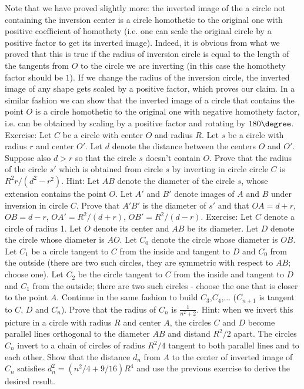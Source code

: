 Note that we have proved slightly more: the inverted image of the a circle not containing the inversion center is a circle homothetic to the original one with positive coefficient of homothety (i.e. one can scale the original circle by a positive factor to get its inverted image). Indeed, it is obvious from what we proved that this is true if the radius of inversion circle is equal to the length of the tangents from $O$ to the circle we are inverting (in this case the homothety factor should be $1$). If we change the radius of the inversion circle, the inverted image of any shape gets scaled by a positive factor, which proves our claim.
In a similar fashion we can show that the inverted image of a circle that contains the point $O$ is a circle homothetic to the original one with negative homothety factor, i.e. can be obtained by scaling by a positive factor and rotating by $180\degree$.
Exercise:
Let $C$ be a circle with center $O$ and radius $R$. Let $s$ be a circle with radius $r$ and center $O'$. Let $d$ denote the distance between the centers $O$ and $O'$. Suppose also $d>r$ so that the circle $s$ doesn't contain $O$. Prove that the radius of the circle $s'$ which is obtained from circle $s$ by inverting in circle circle $C$ is $R^2 r/(d^2-r^2)$.
Hint: Let $AB$ denote the diameter of the circle $s$, whose extension contains the point $O$. Let $A'$ and $B'$ denote images of $A$ and $B$ under inversion in circle $C$. Prove that $A'B'$ is the diameter of $s'$ and that $OA=d+r$, $OB=d-r$, $OA'=R^2/(d+r)$, $OB'=R^2/(d-r)$.
Exercise:
Let $C$ denote a circle of radius 1. Let $O$ denote its center and $AB$ be its diameter. Let $D$ denote the circle whose diameter is $AO$. Let $C_0$ denote the circle whose diameter is $OB$. Let $C_1$ be a circle tangent to $C$ from the inside and tangent to $D$ and $C_0$ from the outside (there are two such circles, they are symmetric with respect to $AB$; choose one). Let $C_2$ be the circle tangent to $C$ from the inside and tangent to $D$ and $C_1$ from the outside; there are two such circles - choose the one that is closer to the point $A$. Continue in the same fashion to build $C_3$,$C_4$,... ($C_{n+1}$ is tangent to $C$, $D$ and $C_n$). Prove that the radius of $C_n$ is $\frac{1}{n^2+2}$.
Hint: when we invert this picture in a circle with radius $R$ and center $A$, the circles $C$ and $D$ become parallel lines orthogonal to the diameter $AB$ and distand $R^2/2$ apart. The circles $C_n$ invert to a chain of circles of radius $R^2/4$ tangent to both parallel lines and to each other. Show that the distance $d_n$ from $A$ to the center of inverted image of $C_n$ satisfies $d_n^2= (n^2/4+9/16)R^4$ and use the previous exercise to derive the desired result.
